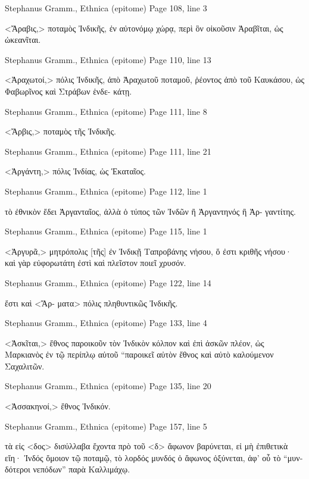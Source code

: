 \documentclass[12pt,letterpaper,twoside,final]{memoir}
\begin{document}
\begin{greek}
Stephanus Gramm., Ethnica (epitome) 
Page 108, line 3

<Ἄραβις,> ποταμὸς Ἰνδικῆς, ἐν αὐτονόμῳ χώρᾳ, περὶ ὃν 
οἰκοῦσιν Ἀραβῖται, ὡς ὠκεανῖται. 



Stephanus Gramm., Ethnica (epitome) 
Page 110, line 13

<Ἀραχωτοί,> πόλις Ἰνδικῆς, ἀπὸ Ἀραχωτοῦ ποταμοῦ, 
ῥέοντος ἀπὸ τοῦ Καυκάσου, ὡς Φαβωρῖνος καὶ Στράβων ἑνδε-
κάτῃ. 



Stephanus Gramm., Ethnica (epitome) 
Page 111, line 8

<Ἄρβις,> ποταμὸς τῆς Ἰνδικῆς. 



Stephanus Gramm., Ethnica (epitome) 
Page 111, line 21

<Ἀργάντη,> πόλις Ἰνδίας, ὡς Ἑκαταῖος. 



Stephanus Gramm., Ethnica (epitome) 
Page 112, line 1

                                                      τὸ ἐθνικὸν ἔδει   
Ἀργανταῖος, ἀλλὰ ὁ τύπος τῶν Ἰνδῶν ἢ Ἀργαντηνός ἢ Ἀρ-
γαντίτης. 



Stephanus Gramm., Ethnica (epitome) 
Page 115, line 1

<Ἀργυρᾶ,> μητρόπολις [τῆς] ἐν Ἰνδικῇ Ταπροβάνης νήσου, 
ὅ ἐστι κριθῆς νήσου· καὶ γὰρ εὐφορωτάτη ἐστὶ καὶ πλεῖστον 
ποιεῖ χρυσόν. 



Stephanus Gramm., Ethnica (epitome) 
Page 122, line 14

                                                      ἔστι καὶ <Ἅρ-
ματα> πόλις πληθυντικῶς Ἰνδικῆς. 



Stephanus Gramm., Ethnica (epitome) 
Page 133, line 4

<Ἀσκῖται,> ἔθνος παροικοῦν τὸν Ἰνδικὸν κόλπον καὶ ἐπὶ 
ἀσκῶν πλέον, ὡς Μαρκιανὸς ἐν τῷ περίπλῳ αὐτοῦ “παροικεῖ 
αὐτὸν ἔθνος καὶ αὐτὸ καλούμενον Σαχαλιτῶν. 



Stephanus Gramm., Ethnica (epitome) 
Page 135, line 20

<Ἀσσακηνοί,> ἔθνος Ἰνδικόν. 



Stephanus Gramm., Ethnica (epitome) 
Page 157, line 5

                                                            τὰ εἰς <δος> 
δισύλλαβα ἔχοντα πρὸ τοῦ <δ> ἄφωνον βαρύνεται, εἰ μὴ ἐπιθετικὰ 
εἴη· Ἰνδός ὅμοιον τῷ ποταμῷ, τὸ λορδός μυνδός ὁ ἄφωνος 
ὀξύνεται, ἀφ' οὗ τὸ “μυνδότεροι νεπόδων” παρὰ Καλλιμάχῳ. 




\end{greek}
\end{document}

